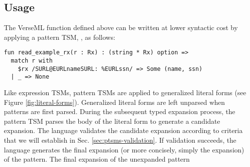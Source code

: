 \subsection{Usage}\label{sec:ptsms-usage}
The VerseML function  defined above can be written at lower syntactic cost by applying a pattern TSM, , as follows:
\begin{lstlisting}
fun read_example_rx(r : Rx) : (string * Rx) option => 
  match r with 
    $rx /SURL@EURLnameSURL: %EURLssn/ => Some (name, ssn)
  | _ => None
\end{lstlisting}
Like expression TSMs, pattern TSMs are applied to generalized literal forms (see Figure \ref{fig:literal-forms}). Generalized literal forms are left unparsed when patterns are first parsed. During the subsequent typed expansion process, the pattern TSM parses the body of the literal form to generate a candidate expansion. The language  validates the candidate expansion according to criteria that we will establish in Sec. \ref{sec:ptsms-validation}. If validation succeeds, the language generates the final expansion (or more concisely, simply the expansion) of the pattern. The final expansion of the unexpanded pattern \li{#\dolla#rx /SURL@EURLnameSURL: %
\begin{lstlisting}[numbers=none]
Seq(Str(name), Seq(Str "SSTR: ESTR", ssn))
\end{lstlisting}

The checks for exhaustiveness and redundancy can be performed post-expansion in the usual way, so we do not need to consider them further here. 
}
